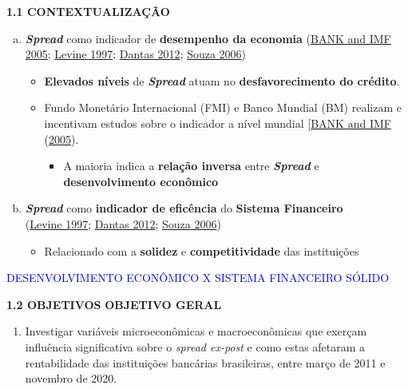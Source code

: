 \documentclass[
  ignorenonframetext,
  aspectratio=169,
  ignorenonframetext]{beamer}
\providecommand{\tightlist}{%
  \setlength{\itemsep}{0pt}\setlength{\parskip}{0pt}}
\begin{document}
\begin{frame}{\textbf{1.1 CONTEXTUALIZAÇÃO}}
\protect\hypertarget{contextualizauxe7uxe3o}{}
\begin{enumerate}
[a.]
\item
  \textbf{\emph{Spread}} como indicador de \textbf{desempenho da
  economia} (\protect\hyperlink{ref-WB:2005}{BANK and IMF 2005};
  \protect\hyperlink{ref-levine:1997}{Levine 1997};
  \protect\hyperlink{ref-dantas:2012}{Dantas 2012};
  \protect\hyperlink{ref-leal:2006}{Souza 2006})

  \begin{itemize}
  \item
    \textbf{Elevados níveis} de \textbf{\emph{Spread}} atuam no
    \textbf{desfavorecimento do crédito}.
  \item
    Fundo Monetário Internacional (FMI) e Banco Mundial (BM) realizam e
    incentivam estudos sobre o indicador a nível mundial
    {[}\protect\hyperlink{ref-WB:2005}{BANK and IMF}
    (\protect\hyperlink{ref-WB:2005}{2005}).

    \begin{itemize}
    \tightlist
    \item
      A maioria indica a \textbf{relação inversa} entre
      \textbf{\emph{Spread}} e \textbf{desenvolvimento econômico}
    \end{itemize}
  \end{itemize}
\item
  \textbf{\emph{Spread}} como \textbf{indicador de eficência} do
  \textbf{Sistema Financeiro}\\
  (\protect\hyperlink{ref-levine:1997}{Levine 1997};
  \protect\hyperlink{ref-dantas:2012}{Dantas 2012};
  \protect\hyperlink{ref-leal:2006}{Souza 2006})

  \begin{itemize}
  \tightlist
  \item
    Relacionado com a \textbf{solidez} e \textbf{competitividade} das
    instituições
  \end{itemize}
\end{enumerate}

\textcolor{blue}{DESENVOLVIMENTO ECONÔMICO X SISTEMA FINANCEIRO SÓLIDO}
\end{frame}

\begin{frame}{\textbf{1.2 OBJETIVOS}}
\protect\hypertarget{objetivos}{}
\textbf{OBJETIVO GERAL}

\begin{enumerate}
\tightlist
\item
  Investigar variáveis microeconômicas e macroeconômicas que exerçam
  influência significativa sobre o \emph{spread ex-post} e como estas
  afetaram a rentabilidade das instituições bancárias brasileiras, entre
  março de 2011 e novembro de 2020.
\end{enumerate}
\end{frame}
\end{document}
